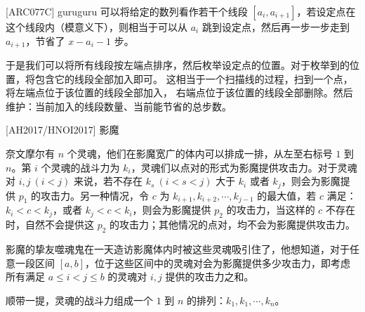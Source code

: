 \documentclass{beamer}
\begin{document}
\begin{frame}{[ARC077C] guruguru}
    \footnotesize
    可以将给定的数列看作若干个线段 $[a_i,a_{i+1}]$，若设定点在这个线段内（模意义下），则相当于可以从
    $a_i$ 跳到设定点，然后再一步一步走到 $a_{i+1}$，节省了 $x-a_i-1$ 步。
 
    \vspace{1em}\pause
    于是我们可以将所有线段按左端点排序，然后枚举设定点的位置。对于枚举到的位置，将包含它的线段全部加入即可。
    这相当于一个扫描线的过程，扫到一个点，将左端点位于该位置的线段全部加入，
    右端点位于该位置的线段全部删除。然后维护：当前加入的线段数量、当前能节省的总步数。
\end{frame}

\begin{frame}{[AH2017/HNOI2017] 影魔}
    \footnotesize

    奈文摩尔有 $n$ 个灵魂，他们在影魔宽广的体内可以排成一排，从左至右标号 $1$ 到 $n$。第 $i$ 个灵魂的战斗力为 $k_i$，灵魂们以点对的形式为影魔提供攻击力。对于灵魂对 $i, j\ (i<j)$ 来说，若不存在 $k_s\ (i<s<j)$ 大于 $k_i$ 或者 $k_j$，则会为影魔提供 $p_1$ 的攻击力。另一种情况，令 $c$ 为 $k_{i + 1}, k_{i + 2}, \cdots, k_{j -1}$ 的最大值，若 $c$ 满足：$k_i < c < k_j$，或者 $k_j < c < k_i$，则会为影魔提供 $p_2$ 的攻击力，当这样的 $c$ 不存在时，自然不会提供这 $p_2$ 的攻击力；其他情况的点对，均不会为影魔提供攻击力。

    \vspace{1em}
    影魔的挚友噬魂鬼在一天造访影魔体内时被这些灵魂吸引住了，他想知道，对于任意一段区间 $[a, b]$，位于这些区间中的灵魂对会为影魔提供多少攻击力，即考虑所有满足 $a\le i<j\le b$ 的灵魂对 $i, j$ 提供的攻击力之和。
    
    \vspace{1em}
    顺带一提，灵魂的战斗力组成一个 $1$ 到 $n$ 的排列：$k_1, k_1, \cdots, k_n$。
\end{frame}
\end{document}
